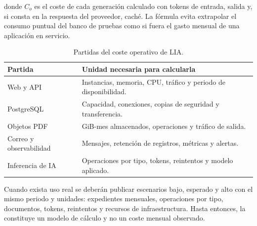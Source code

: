 donde $C_o$ es el coste de cada generación calculado con tokens de entrada,
salida y, si consta en la respuesta del proveedor, caché. La fórmula evita
extrapolar el consumo puntual del banco de pruebas como si fuera el gasto
mensual de una aplicación en servicio.

\begin{table}[H]
  \centering
  \small
  \caption{Partidas del coste operativo de LIA.}
  \label{tab:operational-cost-items}
  \begin{tabular}{@{}p{3.2cm}p{9.8cm}@{}}
    \toprule
    \textbf{Partida} & \textbf{Unidad necesaria para calcularla} \\
    \midrule
    Web y API & Instancias, memoria, CPU, tráfico y periodo de disponibilidad. \\
    PostgreSQL & Capacidad, conexiones, copias de seguridad y transferencia. \\
    Objetos PDF & GiB-mes almacenados, operaciones y tráfico de salida. \\
    Correo y observabilidad & Mensajes, retención de registros, métricas y alertas. \\
    Inferencia de IA & Operaciones por tipo, tokens, reintentos y modelo aplicado. \\
    \bottomrule
  \end{tabular}
\end{table}

Cuando exista uso real se deberán publicar escenarios bajo, esperado y alto
con el mismo periodo y unidades: expedientes mensuales, operaciones por tipo,
documentos, tokens, reintentos y recursos de infraestructura. Hasta entonces,
la  constituye un modelo de cálculo y no un
coste mensual observado.
